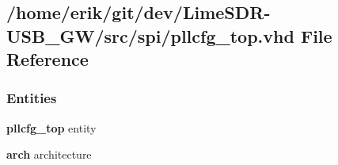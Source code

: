 \subsection{/home/erik/git/dev/\+Lime\+S\+D\+R-\/\+U\+S\+B\+\_\+\+G\+W/src/spi/pllcfg\+\_\+top.vhd File Reference}
\label{pllcfg__top_8vhd}
\subsubsection*{Entities}
\begin{DoxyCompactItemize}
\item 
{\bf pllcfg\+\_\+top} entity
\item 
{\bf arch} architecture
\end{DoxyCompactItemize}
